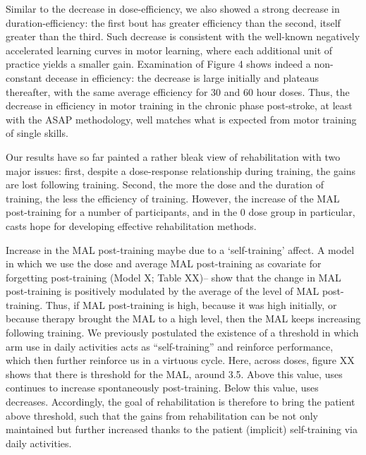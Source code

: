 Similar to the decrease in dose-efficiency, we also showed a strong decrease in duration-efficiency: the first bout has greater efficiency than the second, itself greater than the third. 
Such decrease is consistent with the well-known negatively accelerated learning curves in motor learning, where each additional unit of practice yields a smaller gain. 
Examination of Figure 4 shows indeed a non-constant decease in efficiency: the decrease is large initially and plateaus thereafter, with the same average efficiency for 30 and 60 hour doses. 
Thus, the decrease in efficiency in motor training in the chronic phase post-stroke, at least with the ASAP methodology, well matches what is expected from motor training of single skills.

Our results have so far painted a rather bleak view of rehabilitation with two major issues: first, despite a dose-response relationship during training, the gains are lost following training. 
Second, the more the dose and the duration of training, the less the efficiency of training. 
However, the increase of the MAL post-training for a number of participants, and in the 0 dose group in particular, casts hope for developing effective rehabilitation methods. 

Increase in the MAL post-training maybe due to a ‘self-training’ affect. 
A model in which we use the dose and average MAL post-training  as covariate for forgetting post-training (Model X; Table XX)– show  that the change in MAL post-training is positively modulated by the average of the level of MAL post-training. 
Thus, if MAL post-training is high, because it was high initially, or because therapy brought the MAL to a high level, then the MAL keeps increasing following training. 
We previously postulated the existence of a threshold in which arm use in daily activities acts as “self-training” and reinforce performance, which then further reinforce us in a virtuous cycle. 
Here, across doses, figure XX shows that there is threshold for the MAL, around 3.5. 
Above this value, uses continues to increase spontaneously post-training. 
Below this value, uses decreases. 
Accordingly, the goal of rehabilitation is therefore to bring the patient above threshold, such that the gains from rehabilitation can be not only maintained but further increased thanks to the patient (implicit) self-training via daily activities. 

